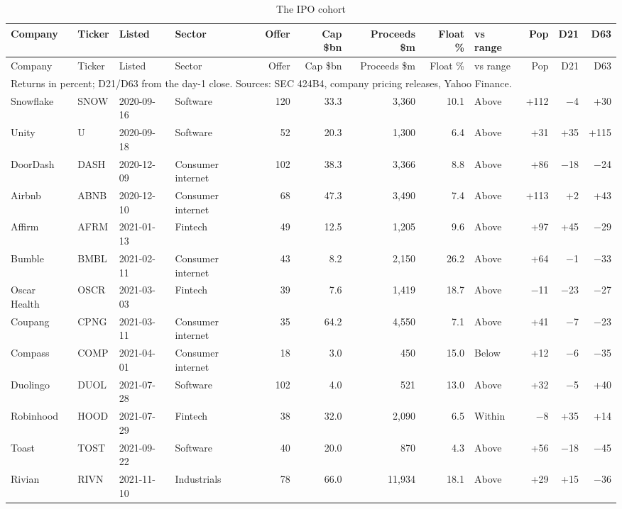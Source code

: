 \begin{scriptsize}\setlength{\tabcolsep}{2.6pt}
\begin{longtable}{llllrrrrlrrr}
\caption{The IPO cohort}\label{tab:cohort}\\
\toprule
Company & Ticker & Listed & Sector & Offer & Cap \$bn & Proceeds \$m & Float \% & vs range & Pop & D21 & D63 \\
\midrule
\endfirsthead
\toprule Company & Ticker & Listed & Sector & Offer & Cap \$bn & Proceeds \$m & Float \% & vs range & Pop & D21 & D63 \\ \midrule
\endhead
\bottomrule \multicolumn{12}{l}{\scriptsize Returns in percent; D21/D63 from the day-1 close. Sources: SEC 424B4, company pricing releases, Yahoo Finance.} \\ \endlastfoot
Snowflake & SNOW & 2020-09-16 & Software & 120 & 33.3 & 3,360 & 10.1 & Above & +112 & $-$4 & +30 \\
Unity & U & 2020-09-18 & Software & 52 & 20.3 & 1,300 & 6.4 & Above & +31 & +35 & +115 \\
DoorDash & DASH & 2020-12-09 & Consumer internet & 102 & 38.3 & 3,366 & 8.8 & Above & +86 & $-$18 & $-$24 \\
Airbnb & ABNB & 2020-12-10 & Consumer internet & 68 & 47.3 & 3,490 & 7.4 & Above & +113 & +2 & +43 \\
Affirm & AFRM & 2021-01-13 & Fintech & 49 & 12.5 & 1,205 & 9.6 & Above & +97 & +45 & $-$29 \\
Bumble & BMBL & 2021-02-11 & Consumer internet & 43 & 8.2 & 2,150 & 26.2 & Above & +64 & $-$1 & $-$33 \\
Oscar Health & OSCR & 2021-03-03 & Fintech & 39 & 7.6 & 1,419 & 18.7 & Above & $-$11 & $-$23 & $-$27 \\
Coupang & CPNG & 2021-03-11 & Consumer internet & 35 & 64.2 & 4,550 & 7.1 & Above & +41 & $-$7 & $-$23 \\
Compass & COMP & 2021-04-01 & Consumer internet & 18 & 3.0 & 450 & 15.0 & Below & +12 & $-$6 & $-$35 \\
Duolingo & DUOL & 2021-07-28 & Software & 102 & 4.0 & 521 & 13.0 & Above & +32 & $-$5 & +40 \\
Robinhood & HOOD & 2021-07-29 & Fintech & 38 & 32.0 & 2,090 & 6.5 & Within & $-$8 & +35 & +14 \\
Toast & TOST & 2021-09-22 & Software & 40 & 20.0 & 870 & 4.3 & Above & +56 & $-$18 & $-$45 \\
Rivian & RIVN & 2021-11-10 & Industrials & 78 & 66.0 & 11,934 & 18.1 & Above & +29 & +15 & $-$36 \\

\end{longtable}
\end{scriptsize}
